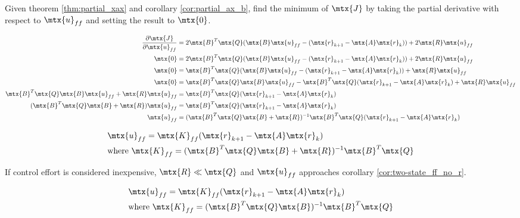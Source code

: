 Given theorem \ref{thm:partial_xax} and corollary \ref{cor:partial_ax_b}, find
the minimum of $\mtx{J}$ by taking the partial derivative with respect to
$\mtx{u}_{ff}$ and setting the result to $\mtx{0}$.

\begin{align*}
  \frac{\partial\mtx{J}}{\partial\mtx{u}_{ff}} &= 2\mtx{B}^T\mtx{Q}
    (\mtx{B}\mtx{u}_{ff} - (\mtx{r}_{k+1} - \mtx{A}\mtx{r}_k)) +
    2\mtx{R}\mtx{u}_{ff} \\
  \mtx{0} &= 2\mtx{B}^T\mtx{Q}
    (\mtx{B}\mtx{u}_{ff} - (\mtx{r}_{k+1} - \mtx{A}\mtx{r}_k)) +
    2\mtx{R}\mtx{u}_{ff} \\
  \mtx{0} &= \mtx{B}^T\mtx{Q}
    (\mtx{B}\mtx{u}_{ff} - (\mtx{r}_{k+1} - \mtx{A}\mtx{r}_k)) +
    \mtx{R}\mtx{u}_{ff} \\
  \mtx{0} &= \mtx{B}^T\mtx{Q}\mtx{B}\mtx{u}_{ff} -
    \mtx{B}^T\mtx{Q}(\mtx{r}_{k+1} - \mtx{A}\mtx{r}_k) + \mtx{R}\mtx{u}_{ff} \\
  \mtx{B}^T\mtx{Q}\mtx{B}\mtx{u}_{ff} + \mtx{R}\mtx{u}_{ff} &=
    \mtx{B}^T\mtx{Q}(\mtx{r}_{k+1} - \mtx{A}\mtx{r}_k) \\
  (\mtx{B}^T\mtx{Q}\mtx{B} + \mtx{R})\mtx{u}_{ff} &=
    \mtx{B}^T\mtx{Q}(\mtx{r}_{k+1} - \mtx{A}\mtx{r}_k) \\
  \mtx{u}_{ff} &= (\mtx{B}^T\mtx{Q}\mtx{B} + \mtx{R})^{-1}
    \mtx{B}^T\mtx{Q}(\mtx{r}_{k+1} - \mtx{A}\mtx{r}_k)
\end{align*}

\begin{theorem}
  \label{thm:two-state_ff}

  \begin{align}
    &\mtx{u}_{ff} = \mtx{K}_{ff} (\mtx{r}_{k+1} - \mtx{A}\mtx{r}_k) \\
    &\text{where } \mtx{K}_{ff} =
      (\mtx{B}^T\mtx{Q}\mtx{B} + \mtx{R})^{-1}\mtx{B}^T\mtx{Q}
  \end{align}
\end{theorem}

If \gls{control effort} is considered inexpensive, $\mtx{R} \ll \mtx{Q}$ and
$\mtx{u}_{ff}$ approaches corollary \ref{cor:two-state_ff_no_r}.

\begin{corollary}
  \label{cor:two-state_ff_no_r}

  \begin{align}
    &\mtx{u}_{ff} = \mtx{K}_{ff} (\mtx{r}_{k+1} - \mtx{A}\mtx{r}_k) \\
    &\text{where } \mtx{K}_{ff} =
      (\mtx{B}^T\mtx{Q}\mtx{B})^{-1}\mtx{B}^T\mtx{Q}
  \end{align}
\end{corollary}

